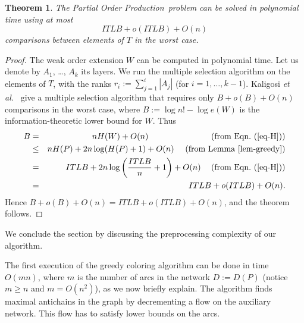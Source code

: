 \documentclass[12pt,oneside]{article}
\newtheorem{theorem}{Theorem}
\newcommand{\partsort}{{\sc Partial Order Production}}
\begin{document}
\begin{theorem}
\label{th-ub}
The \partsort\ problem can be solved in polynomial time using at most
\begin{equation}
\label{ub-exp}
ITLB + o(ITLB) + O(n)
\end{equation}
comparisons between elements of $T$ in the worst case.
\end{theorem}
\begin{proof}
The weak order extension $W$ can be computed in polynomial time.
Let us denote by $A_1$, \ldots, $A_k$ its layers. We run the multiple selection algorithm on the elements of $T$, with the ranks $r_i := \sum_{j=1}^i |A_j|$ (for $i=1, \ldots, k-1$). Kaligosi {\it et al.}~\cite{KMMS05} give a multiple selection algorithm that requires only
$B + o(B) + O(n)$ comparisons in the worst case, where $B := \log n! - \log e(W)$ is the information-theoretic lower
bound for $W$. Thus
\begin{eqnarray*}
B  & =    & n H(W) + O(n) \hspace{7.2em} {\textrm{ (from\ Eqn.~(\ref{eq-H}))}}\\
   & \leq & n H(P) + 2 n \log (H(P)+1) + O(n) \hspace{1em} \textrm{ (from Lemma~\ref{lem-greedy})} \\
   & = & ITLB + 2 n \log \left( \frac{ITLB}{n} + 1\right) + O(n)\hspace{.9em} {\textrm{ (from\ Eqn.~(\ref{eq-H}))}}  \\
   & = & ITLB + o(ITLB) + O(n).
\end{eqnarray*}
Hence $B + o(B) + O(n) = ITLB + o(ITLB) + O(n)$, and the theorem follows.
\end{proof}

We conclude the section by discussing the preprocessing complexity of our algorithm.

The first execution of the greedy coloring algorithm can be done in time $O(mn)$,
where $m$ is the number of arcs in the network $D:=D(P)$ (notice $m\geq n$ and $m = O(n^2)$), as we now briefly explain. The algorithm finds maximal antichains in the graph by decrementing a flow on the auxiliary network.  This flow has to satisfy lower bounds on the arcs.
\end{document}
